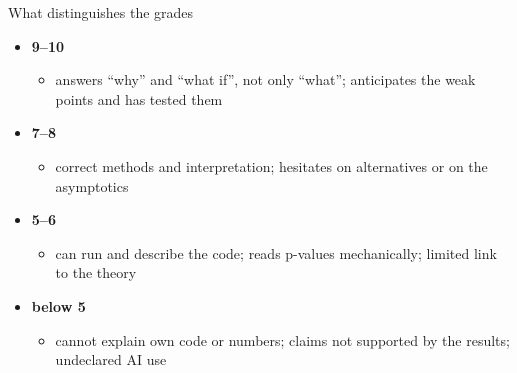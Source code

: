 \begin{frame}{What distinguishes the grades}
\itemsize{\small}
\begin{itemize}
    \item \textbf{9--10}
    \begin{itemize}
        \item answers ``why'' and ``what if'', not only ``what''; anticipates the weak points and has tested them
    \end{itemize}
    \item \textbf{7--8}
    \begin{itemize}
        \item correct methods and interpretation; hesitates on alternatives or on the asymptotics
    \end{itemize}
    \item \textbf{5--6}
    \begin{itemize}
        \item can run and describe the code; reads p-values mechanically; limited link to the theory
    \end{itemize}
    \item \textbf{below 5}
    \begin{itemize}
        \item cannot explain own code or numbers; claims not supported by the results; undeclared AI use
    \end{itemize}
\end{itemize}
\end{frame}

